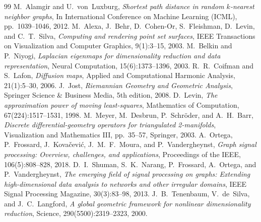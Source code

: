 \documentclass[11pt,a4paper]{article}
\theoremstyle{definition}
\begin{document}
\begin{thebibliography}{99}
 M.~Alamgir and U.~von~Luxburg, \emph{Shortest path distance in random $k$-nearest neighbor graphs}, In International Conference on Machine Learning (ICML), pp.~1039--1046, 2012.
 M.~Alexa, J.~Behr, D.~Cohen-Or, S.~Fleishman, D.~Levin, and C.~T.~Silva, \emph{Computing and rendering point set surfaces}, IEEE Transactions on Visualization and Computer Graphics, 9(1):3--15, 2003.
 M.~Belkin and P.~Niyogi, \emph{Laplacian eigenmaps for dimensionality reduction and data representation}, Neural Computation, 15(6):1373--1396, 2003.
 R.~R.~Coifman and S.~Lafon, \emph{Diffusion maps}, Applied and Computational Harmonic Analysis, 21(1):5--30, 2006.
 J.~Jost, \emph{Riemannian Geometry and Geometric Analysis}, Springer Science \& Business Media, 5th edition, 2008.
 D.~Levin, \emph{The approximation power of moving least-squares}, Mathematics of Computation, 67(224):1517--1531, 1998.
 M.~Meyer, M.~Desbrun, P.~Schr{\"o}der, and A.~H.~Barr, \emph{Discrete differential-geometry operators for triangulated 2-manifolds}, Visualization and Mathematics III, pp.~35--57, Springer, 2003.
 A.~Ortega, P.~Frossard, J.~Kova{\v{c}}evi{\'c}, J.~M.~F.~Moura, and P.~Vandergheynst, \emph{Graph signal processing: Overview, challenges, and applications}, Proceedings of the IEEE, 106(5):808--828, 2018.
 D.~I.~Shuman, S.~K.~Narang, P.~Frossard, A.~Ortega, and P.~Vandergheynst, \emph{The emerging field of signal processing on graphs: Extending high-dimensional data analysis to networks and other irregular domains}, IEEE Signal Processing Magazine, 30(3):83--98, 2013.
 J.~B.~Tenenbaum, V.~de~Silva, and J.~C.~Langford, \emph{A global geometric framework for nonlinear dimensionality reduction}, Science, 290(5500):2319--2323, 2000.
\end{thebibliography}
\end{document}
